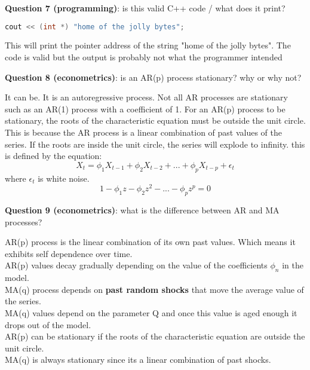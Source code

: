 \documentclass[a4paper,10pt]{article}
\begin{document}
\vspace{0.5cm}
\noindent
\textbf{Question 7 (programming)}: is this valid C++ code /  what does it print?
\begin{lstlisting}[language=C++]
    cout << (int *) "home of the jolly bytes";
\end{lstlisting}
\vspace{0.25cm}
\noindent
\begin{sloppypar}
    This will print the pointer address of the string "home of the jolly bytes".
    The code is valid but the output is probably not what the programmer intended
\end{sloppypar}
\vspace{0.5cm}
\noindent
\textbf{Question 8 (econometrics)}: is an AR(p) process stationary? why or why not? 
\vspace{0.25cm}
\noindent
\begin{sloppypar}
    It can be. It is an autoregressive process. Not all AR processes are stationary such as an AR(1) process with a coefficient of 1.
    For an AR(p) process to be stationary, the roots of the characteristic equation must be outside the unit circle.
    This is because the AR process is a linear combination of past values of the series.
    If the roots are inside the unit circle, the series will explode to infinity.
    this is defined by the equation:
    $$X_t = \phi_1X_{t-1} + \phi_2X_{t-2} + ... + \phi_pX_{t-p} + \epsilon_t$$
    where $\epsilon_t$ is white noise.
    $$1 - \phi_1z - \phi_2z^2 - ... - \phi_pz^p = 0$$
\end{sloppypar}
\vspace{0.5cm}
\noindent
\textbf{Question 9 (econometrics)}: what is the difference between AR and MA processes?
\vspace{0.25cm}
\noindent
\begin{sloppypar}
    \noindent
    AR(p) process is the linear combination of its own past values. Which means it exhibits self dependence over time. \\ 
    AR(p) values decay gradually depending on the value of the coefficients $\phi_n$ in the model.\\ 
    MA(q) process depends on \textbf{past random shocks} that move the average value of the series. \\ 
    MA(q) values depend on the parameter Q and once this value is aged enough it drops out of the model.\\
    AR(p) can be stationary if the roots of the characteristic equation are outside the unit circle.\\
    MA(q) is always stationary since its a linear combination of past shocks.\\
\end{sloppypar}
\end{document}
